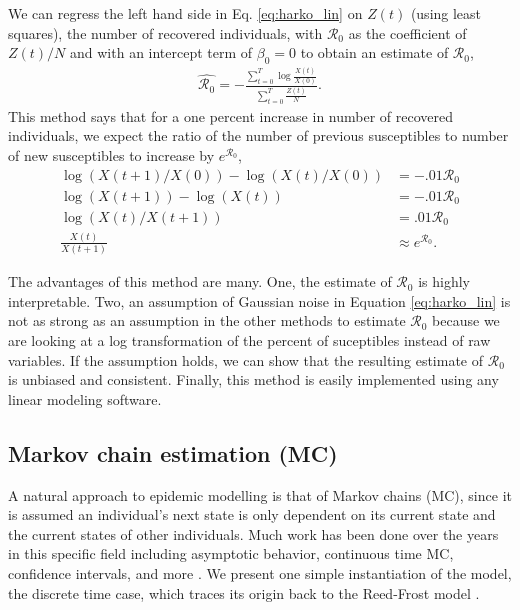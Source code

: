 \documentclass[12pt]{article}
\newcommand{\rr}{\ensuremath{\mathcal{R}_0}}
\begin{document}
We can regress the left hand side in Eq. \ref{eq:harko_lin} on $Z(t)$ (using least squares), the number of recovered individuals, with $\rr$ as the coefficient of $Z(t)/N$ and with an intercept term of $\beta_0=0$ to obtain an estimate of $\rr$,
\begin{align*}
  \hat{\rr} = -\frac{\sum_{t=0}^T \log \frac{ X(t)}{X(0)}}{\sum_{t=0}^T\frac{Z(t)}{N}}.
\end{align*}
This method says that for a one percent increase in number of recovered individuals, we expect the ratio of the number of previous susceptibles to number of new susceptibles to increase by $e^{\rr}$,
\begin{align*}
  \log \left ( X(t+1)/ X(0) \right ) - \log \left ( X(t)/X(0) \right ) &= - .01\rr\\
  \log \left ( X(t+1) \right ) - \log \left ( X(t) \right )  &=- .01\rr\\
  \log \left ( X(t) / X(t+1) \right ) &= .01\rr\\
  \frac{X(t)}{X(t+1)}  &\approx e^{\rr}.
\end{align*}

The advantages of this method are many.  One, the estimate of $\rr$ is highly interpretable.  Two, an assumption of Gaussian noise in Equation \ref{eq:harko_lin} is not as strong as an assumption in the other methods to estimate $\rr$ because we are looking at a log transformation of the percent of suceptibles instead of raw variables.  If the assumption holds, we can show that the resulting estimate of $\rr$ is unbiased and consistent.  Finally,  this method is easily implemented using any linear modeling software.  

\subsection{Markov chain estimation (MC)}
A natural approach to epidemic modelling is that of Markov chains (MC), since it is assumed an individual's next state is only dependent on its current state and the current states of other individuals.  Much work has been done over the years in this specific field including asymptotic behavior, continuous time MC, confidence intervals, and more \citep{jacquez1991,gani1995,daley2001epidemic}.  We present one simple instantiation of the model, the discrete time case, which traces its origin back to the Reed-Frost model \citep{abbey1952}.
\end{document}
